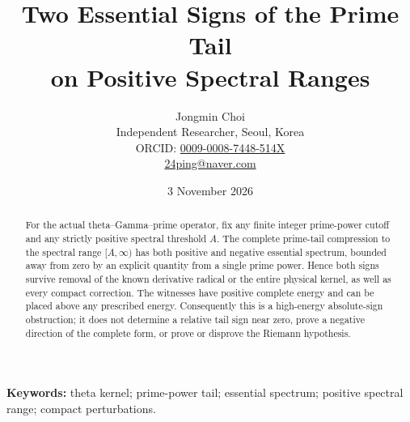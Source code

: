 \documentclass[11pt]{article}
\title{Two Essential Signs of the Prime Tail\\on Positive Spectral Ranges}
\author{Jongmin Choi\\\small Independent Researcher, Seoul, Korea\\\small ORCID: \href{https://orcid.org/0009-0008-7448-514X}{0009-0008-7448-514X}\\\small \href{mailto:24ping@naver.com}{24ping@naver.com}}
\date{3 November 2026}
\begin{document}
\maketitle
\begin{abstract}
For the actual theta--Gamma--prime operator, fix any finite integer prime-power cutoff and any strictly positive spectral threshold $A$. The complete prime-tail compression to the spectral range $[A,\infty)$ has both positive and negative essential spectrum, bounded away from zero by an explicit quantity from a single prime power. Hence both signs survive removal of the known derivative radical or the entire physical kernel, as well as every compact correction. The witnesses have positive complete energy and can be placed above any prescribed energy. Consequently this is a high-energy absolute-sign obstruction; it does not determine a relative tail sign near zero, prove a negative direction of the complete form, or prove or disprove the Riemann hypothesis.
\end{abstract}
\noindent\textbf{Keywords:} theta kernel; prime-power tail; essential spectrum; positive spectral range; compact perturbations.
\end{document}
